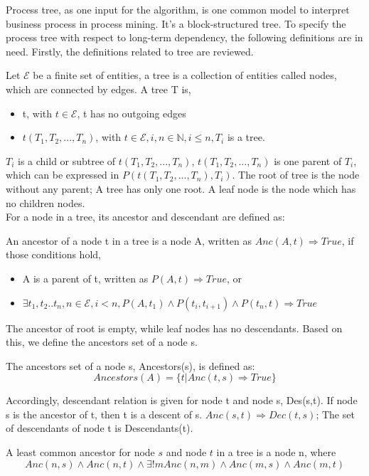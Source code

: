 Process tree, as one input for the algorithm, is one common model to interpret business process in process mining. It's a block-structured tree. To specify the process tree with respect to long-term dependency, the following definitions are in need. Firstly, the definitions related to tree are reviewed.
\begin{definition}[Tree]
	Let $ \mathscr{E} $ be a finite set of entities, a tree is a collection of entities called nodes, which are connected by edges. A tree T is,
	
	\begin{itemize}
		\item t, with  $t\in \mathscr{E}$, t has no outgoing edges
		\item $t(T_1,T_2,...,T_n)$, with $t\in \mathscr{E}, i,n\in \mathbb{N}, i \leq n ,T_i$ is a tree.
	\end{itemize}
\end{definition}
$T_i$ is a child or subtree of $t(T_1,T_2,...,T_n)$, $t(T_1,T_2,...,T_n)$ is one parent of $T_i$, which can be expressed in $P(t(T_1,T_2,...,T_n),T_i)$. The root of tree is the node without any parent; A tree has only one root. A leaf node is the node which has no children nodes.\\
For a node in a tree, its ancestor and descendant are defined as:
\begin{definition}
	An ancestor of a node t in a tree is a node A, written as $ Anc(A,t) \Rightarrow True$, if those conditions hold,  
	\begin{itemize}
		\item A is a parent of t, written as $ P(A,t) \Rightarrow True$, or
		\item $\exists t_1,t_2..t_n,n\in \mathscr{E}, i < n, P(A,t_1)\land P(t_i,t_{i+1}) \land P(t_n,t) \Rightarrow True $
	\end{itemize}
\end{definition}
The ancestor of root is empty, while leaf nodes has no descendants. Based on this, we define the ancestors set of a node s. 
\begin{definition}
	The ancestors set of a node s, Ancestors(s), is defined as: \[ Ancestors(A)=\{t|Anc(t,s) \Rightarrow True \} \]
\end{definition}
Accordingly, descendant relation is given for node t and node s, Des(s,t). If node s is the ancestor of t, then t is a descent of s. $Anc(s,t) \Rightarrow Dec(t,s)$; The set of descendants of node t is Descendants(t).
\begin{definition}
	A least common ancestor for node $s$ and node $t$ in a tree is a node n, where 
	\[Anc(n,s) \land Anc(n,t) \land \exists! m Anc(n,m) \land Anc(m,s) \land Anc(m,t) \]
\end{definition}

